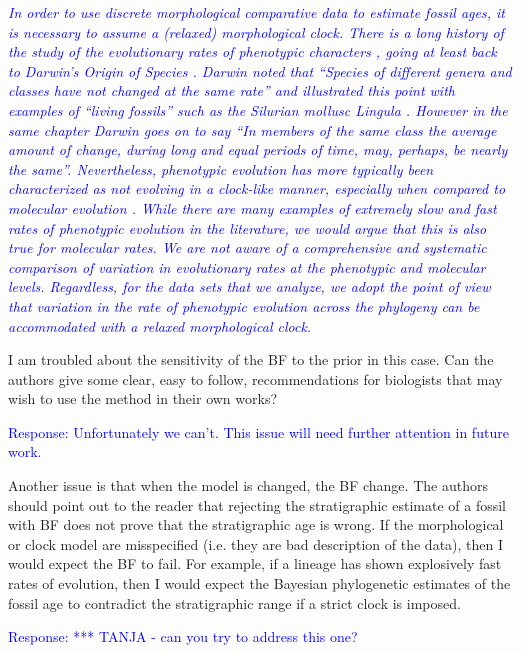 \documentclass[11pt]{article}
\newcommand{\response}[1]{\medskip{}\textcolor{blue}{{Response: #1}}\medskip{}}
\newcommand{\respquote}[1]{{\medskip{}\textcolor{blue}{{\it #1}}\medskip{}}}
\begin{document}
\respquote{In order to use discrete morphological comparative data to estimate fossil ages, it is necessary to assume a (relaxed) morphological clock. There is a long history of the study of the evolutionary rates of phenotypic characters \cite{Simpson1944,Haldane1949,Simpson1953,Gingerich1983,Gingerich1993}, going at least back to Darwin's Origin of Species \cite{Darwin1859}. Darwin noted that {\it ``Species of different genera and classes have not changed at the same rate''} and illustrated this point with examples of ``living fossils'' such as the Silurian mollusc {\it Lingula} \cite{Darwin1859}. However in the same chapter Darwin goes on to say {\it ``In members of the same class the average amount of change, during long and equal periods of time, may, perhaps, be nearly the same''}. Nevertheless, phenotypic evolution has more typically been characterized as not evolving in a clock-like manner, especially when compared to molecular evolution \cite{Kimura1983}. While there are many examples of extremely slow and fast rates of phenotypic evolution in the literature, we would argue that this is also true for molecular rates. We are not aware of a comprehensive and systematic comparison of variation in evolutionary rates at the phenotypic and molecular levels. Regardless, for the data sets that we analyze, we adopt the point of view that variation in the rate of phenotypic evolution across the phylogeny can be accommodated with a relaxed morphological clock.
}

I am troubled about the sensitivity of the BF to the prior in this case. Can the authors give some clear, easy to follow, recommendations for biologists that may wish to use the method in their own works? 

\response{Unfortunately we can't. This issue will need further attention in future work.}

Another issue is that when the model is changed, the BF change. The authors should point out to the reader that rejecting the stratigraphic estimate of a fossil with BF does not prove that the stratigraphic age is wrong. If the morphological or clock model are misspecified (i.e. they are  bad description of the data), then I would expect the BF to fail. For example, if a lineage has shown explosively fast rates of evolution, then I would expect the Bayesian phylogenetic estimates of the fossil age to contradict the stratigraphic range if a strict clock is imposed.

\response{*** TANJA - can you try to address this one?}
\end{document}
